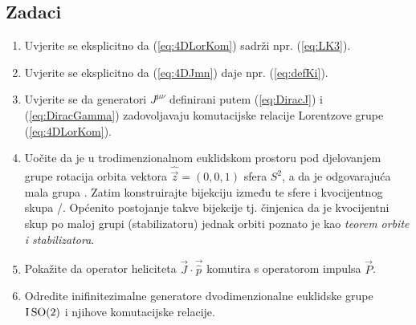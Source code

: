 \subsection*{Zadaci}

\begin{enumerate}[label=\arabic{chapter}.\arabic*.]

\item Uvjerite se eksplicitno da (\ref{eq:4DLorKom}) sadrži npr. (\ref{eq:LK3}).

\item Uvjerite se eksplicitno da (\ref{eq:4DJmn}) daje npr. (\ref{eq:defKi}).

\item Uvjerite se da generatori $J^{\mu\nu}$ definirani putem
(\ref{eq:DiracJ}) i (\ref{eq:DiracGamma}) zadovoljavaju komutacijske
relacije Lorentzove grupe (\ref{eq:4DLorKom}).

\item Uočite da je u trodimenzionalnom euklidskom prostoru pod djelovanjem grupe rotacija 
    orbita vektora $\hat{\vec{z}} = (0, 0, 1)$ sfera $S^2$, a da je odgovarajuća
    mala grupa . Zatim konstruirajte bijekciju između te sfere i kvocijentnog
    skupa /. Općenito postojanje takve bijekcije tj. činjenica da je
    kvocijentni skup po maloj grupi (stabilizatoru)
    jednak orbiti poznato je kao \emph{teorem orbite i stabilizatora}.

\item Pokažite da operator heliciteta $\vec{J}\cdot\vec{\hat{p}}$ komutira s
    operatorom impulsa $\vec{P}$.  \label{zad:help}

\item Odredite inifinitezimalne generatore dvodimenzionalne euklidske
    grupe $\mathrm{I}\,\mathrm{SO}(2)$ i njihove komutacijske relacije.\label{zad:iso2gen}
\end{enumerate}
